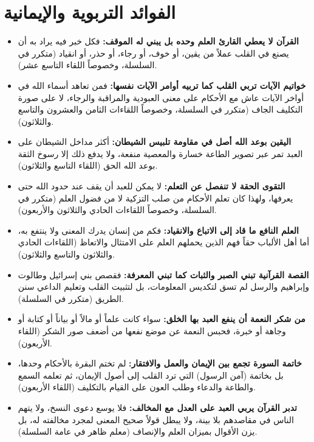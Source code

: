 \section{الفوائد التربوية والإيمانية}
\begin{itemize}
    \item \textbf{القرآن لا يعطي القارئ العلم وحده بل يبني له الموقف:} فكل خبر فيه يراد به أن يصنع في القلب عملاً من يقين، أو خوف، أو رجاء، أو حذر، أو انقياد (متكرر في السلسلة، وخصوصاً اللقاء التاسع عشر).
    \item \textbf{خواتيم الآيات تربي القلب كما تربيه أوامر الآيات نفسها:} فمن تعاهد أسماء الله في أواخر الآيات عاش مع الأحكام على معنى العبودية والمراقبة والرجاء، لا على صورة التكليف الجاف (متكرر في السلسلة، وخصوصاً اللقاءات الثامن والعشرون والتاسع والثلاثون).
    \item \textbf{اليقين بوعد الله أصل في مقاومة تلبيس الشيطان:} أكثر مداخل الشيطان على العبد تمر عبر تصوير الطاعة خسارة والمعصية منفعة، ولا يدفع ذلك إلا رسوخ الثقة بوعد الله الحق (اللقاء التاسع والثلاثون).
    \item \textbf{التقوى الحقة لا تنفصل عن التعلم:} لا يمكن للعبد أن يقف عند حدود الله حتى يعرفها، ولهذا كان تعلم الأحكام من صلب التزكية لا من فضول العلم (متكرر في السلسلة، وخصوصاً اللقاءات الحادي والثلاثون والأربعون).
    \item \textbf{العلم النافع ما قاد إلى الاتباع والانقياد:} فكم من إنسان يدرك المعنى ولا ينتفع به، أما أهل الألباب حقاً فهم الذين يحملهم العلم على الامتثال والاتعاظ (اللقاءات الحادي والثلاثون والتاسع والثلاثون).
    \item \textbf{القصة القرآنية تبني الصبر والثبات كما تبني المعرفة:} فقصص بني إسرائيل وطالوت وإبراهيم والرسل لم تسق لتكديس المعلومات، بل لتثبيت القلب وتعليم الداعي سنن الطريق (متكرر في السلسلة).
    \item \textbf{من شكر النعمة أن ينفع العبد بها الخلق:} سواء كانت علماً أو مالاً أو بياناً أو كتابة أو وجاهة أو خبرة، فحبس النعمة عن موضع نفعها من أضعف صور الشكر (اللقاء الأربعون).
    \item \textbf{خاتمة السورة تجمع بين الإيمان والعمل والافتقار:} لم تختم البقرة بالأحكام وحدها، بل بخاتمة (آمن الرسول) التي ترد القلب إلى أصول الإيمان، ثم تعلمه السمع والطاعة والدعاء وطلب العون على القيام بالتكليف (اللقاء الأربعون).
    \item \textbf{تدبر القرآن يربي العبد على العدل مع المخالف:} فلا يوسع دعوى النسخ، ولا يتهم الناس في مقاصدهم بلا بينة، ولا يبطل قولاً صحيح المعنى لمجرد مخالفته له، بل يزن الأقوال بميزان العلم والإنصاف (معلم ظاهر في عامة السلسلة).
\end{itemize}

